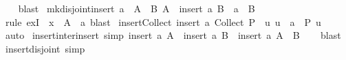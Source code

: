 \begin{isabellebody}
%
\isadelimproof
\ \ %
\endisadelimproof
%
\isatagproof
{}\isamarkupfalse%
\ blast%
\endisatagproof
{\isafoldproof}%
%
\isadelimproof
\isanewline
%
\endisadelimproof
\isanewline
{}\isamarkupfalse%
\ mk{\isacharunderscore}{\kern0pt}disjoint{\isacharunderscore}{\kern0pt}insert{\isacharcolon}{\kern0pt}\ {\isachardoublequoteopen}a\ {\isasymin}\ A\ {\isasymLongrightarrow}\ {\isasymexists}B{\isachardot}{\kern0pt}\ A\ {\isacharequal}{\kern0pt}\ insert\ a\ B\ {\isasymand}\ a\ {\isasymnotin}\ B{\isachardoublequoteclose}\isanewline
\ \ %
\isanewline
%
\isadelimproof
\ \ %
\endisadelimproof
%
\isatagproof
{}\isamarkupfalse%
\ {\isacharparenleft}{\kern0pt}rule\ exI\ {\isacharbrackleft}{\kern0pt}\ x\ {\isacharequal}{\kern0pt}\ {\isachardoublequoteopen}A\ {\isacharminus}{\kern0pt}\ {\isacharbraceleft}{\kern0pt}a{\isacharbraceright}{\kern0pt}{\isachardoublequoteclose}{\isacharbrackright}{\kern0pt}{\isacharparenright}{\kern0pt}\ blast%
\endisatagproof
{\isafoldproof}%
%
\isadelimproof
\isanewline
%
\endisadelimproof
\isanewline
{}\isamarkupfalse%
\ insert{\isacharunderscore}{\kern0pt}Collect{\isacharcolon}{\kern0pt}\ {\isachardoublequoteopen}insert\ a\ {\isacharparenleft}{\kern0pt}Collect\ P{\isacharparenright}{\kern0pt}\ {\isacharequal}{\kern0pt}\ {\isacharbraceleft}{\kern0pt}u{\isachardot}{\kern0pt}\ u\ {\isasymnoteq}\ a\ {\isasymlongrightarrow}\ P\ u{\isacharbraceright}{\kern0pt}{\isachardoublequoteclose}\isanewline
%
\isadelimproof
\ \ %
\endisadelimproof
%
\isatagproof
{}\isamarkupfalse%
\ auto%
\endisatagproof
{\isafoldproof}%
%
\isadelimproof
\isanewline
%
\endisadelimproof
\isanewline
{}\isamarkupfalse%
\ insert{\isacharunderscore}{\kern0pt}inter{\isacharunderscore}{\kern0pt}insert\ {\isacharbrackleft}{\kern0pt}simp{\isacharbrackright}{\kern0pt}{\isacharcolon}{\kern0pt}\ {\isachardoublequoteopen}insert\ a\ A\ {\isasyminter}\ insert\ a\ B\ {\isacharequal}{\kern0pt}\ insert\ a\ {\isacharparenleft}{\kern0pt}A\ {\isasyminter}\ B{\isacharparenright}{\kern0pt}{\isachardoublequoteclose}\isanewline
%
\isadelimproof
\ \ %
\endisadelimproof
%
\isatagproof
{}\isamarkupfalse%
\ blast%
\endisatagproof
{\isafoldproof}%
%
\isadelimproof
\isanewline
%
\endisadelimproof
\isanewline
{}\isamarkupfalse%
\ insert{\isacharunderscore}{\kern0pt}disjoint\ {\isacharbrackleft}{\kern0pt}simp{\isacharbrackright}{\kern0pt}{\isacharcolon}{\kern0pt}\isanewline

\end{isabellebody}
